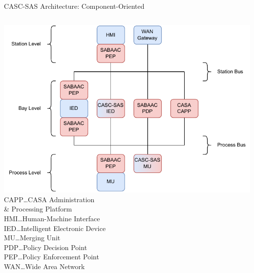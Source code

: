 \documentclass[en]{sdqbeamer}
\begin{document}
\begin{frame}{CASC-SAS Architecture: Component-Oriented}
    \begin{columns}
        \centering
        \includegraphics[height=0.75\textheight]{./figures/casc_architecture_color_shortened.drawio.pdf}
        \footnotesize
        CAPP\dots CASA Administration\\\qquad\qquad\& Processing Platform\\HMI\dots Human-Machine Interface\\IED\dots Intelligent Electronic Device\\MU\dots Merging Unit\\PDP\dots Policy Decision Point\\PEP\dots Policy Enforcement Point\\WAN\dots Wide Area Network
    \end{columns}
\end{frame}
\end{document}
